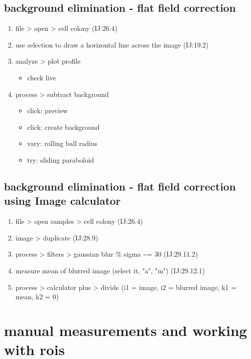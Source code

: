 \documentclass[11pt]{article}
\begin{document}
\subsection{background elimination - flat field correction}
\label{sec-4-2}
\begin{enumerate}
\item file > open > cell colony (IJ:26.4)
\item use selection to draw a horizontal line across the image (IJ:19.2)
\item analyze > plot profile
\begin{itemize}
\item check live
\end{itemize}
\item process > subtract background
\begin{itemize}
\item click: preview
\item click: create background
\item vary: rolling ball radius
\item try: sliding paraboloid
\end{itemize}
\end{enumerate}

\subsection{background elimination - flat field correction using Image calculator}
\label{sec-4-3}
\begin{enumerate}
\item file > open samples > cell colony (IJ:26.4)
\item image > duplicate (IJ:28.9)
\item process > filters > gaussian blur \% sigma \textasciitilde{}= 30 (IJ:29.11.2)
\item measure mean of blurred image (select it, "a", "m") (IJ:29.12.1)
\item process > calculator plus > divide (i1 = image, i2 = blurred image, k1 = mean, k2 = 0)
\end{enumerate}

\section{manual measurements and working with rois}
\label{sec-5}
\end{document}
